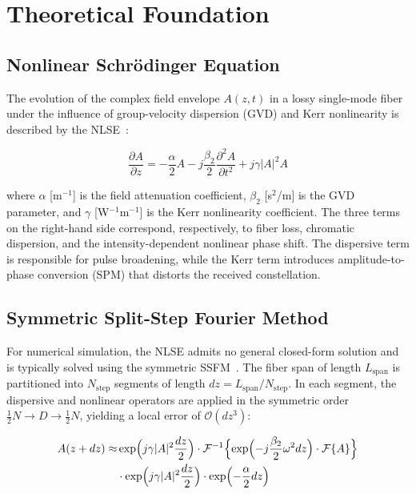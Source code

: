 \documentclass[conference]{IEEEtran}
\begin{document}
\section{Theoretical Foundation}
\label{sec:theory}

\subsection{Nonlinear Schr\"{o}dinger Equation}

The evolution of the complex field envelope $A(z, t)$ in a lossy single-mode fiber under the influence of group-velocity dispersion (GVD) and Kerr nonlinearity is described by the NLSE~\cite{agrawal2001}:

\begin{equation}
\frac{\partial A}{\partial z} = -\frac{\alpha}{2}A
- j\frac{\beta_2}{2}\frac{\partial^2 A}{\partial t^2}
+ j\gamma |A|^2 A
\label{eq:nlse}
\end{equation}

where $\alpha$ [m$^{-1}$] is the field attenuation coefficient, $\beta_2$ [s$^2$/m] is the GVD parameter, and $\gamma$ [W$^{-1}$m$^{-1}$] is the Kerr nonlinearity coefficient. The three terms on the right-hand side correspond, respectively, to fiber loss, chromatic dispersion, and the intensity-dependent nonlinear phase shift. The dispersive term is responsible for pulse broadening, while the Kerr term introduces amplitude-to-phase conversion (SPM) that distorts the received constellation.

\subsection{Symmetric Split-Step Fourier Method}

For numerical simulation, the NLSE admits no general closed-form solution and is typically solved using the symmetric SSFM~\cite{agrawal2001}. The fiber span of length $L_{\text{span}}$ is partitioned into $N_{\text{step}}$ segments of length $dz = L_{\text{span}} / N_{\text{step}}$. In each segment, the dispersive and nonlinear operators are applied in the symmetric order $\frac{1}{2}N \to D \to \frac{1}{2}N$, yielding a local error of $\mathcal{O}(dz^3)$:

\begin{equation}
\begin{aligned}
A(z + dz) \approx &
\exp\Bigl(j\gamma|A|^2 \frac{dz}{2}\Bigr)
\cdot \mathcal{F}^{-1}\Bigl\{\exp\Bigl(-j\frac{\beta_2}{2}\omega^2 dz\Bigr)
\cdot \mathcal{F}\{A\}\Bigr\} \\
& \cdot \exp\Bigl(j\gamma|A|^2 \frac{dz}{2}\Bigr)
\cdot \exp\Bigl(-\frac{\alpha}{2} dz\Bigr)
\end{aligned}
\label{eq:ssfm}
\end{equation}
\end{document}
